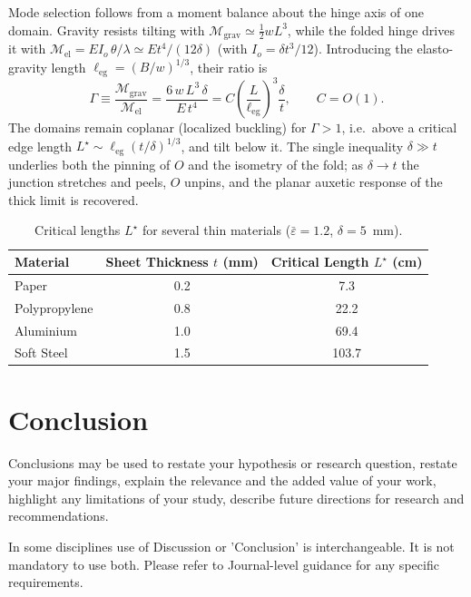\documentclass[pdflatex,sn-mathphys-num]{sn-jnl}%
\theoremstyle{thmstyleone}%
\theoremstyle{thmstyletwo}%
\theoremstyle{thmstylethree}%
\begin{document}
Mode selection follows from a moment balance about the hinge axis of one domain.
Gravity resists tilting with $\mathcal{M}_{\mathrm{grav}}\simeq\tfrac12 wL^3$, while the
folded hinge drives it with $\mathcal{M}_{\mathrm{el}}=E I_o\,\theta/\lambda\simeq
Et^4/(12\delta)$ (with $I_o=\delta t^3/12$). Introducing the elasto-gravity length
$\ell_{\mathrm{eg}}=(B/w)^{1/3}$, their ratio is
\begin{equation}
\Gamma\equiv\frac{\mathcal{M}_{\mathrm{grav}}}{\mathcal{M}_{\mathrm{el}}}
=\frac{6\,w\,L^{3}\,\delta}{E\,t^{4}}
=C\left(\frac{L}{\ell_{\mathrm{eg}}}\right)^{3}\frac{\delta}{t},
\qquad C=O(1).
\end{equation}
The domains remain coplanar (localized buckling) for $\Gamma>1$, i.e.\ above a critical
edge length $L^{\star}\sim\ell_{\mathrm{eg}}(t/\delta)^{1/3}$, and tilt below it. The single
inequality $\delta\gg t$ underlies both the pinning of $O$ and the isometry of the fold;
as $\delta\to t$ the junction stretches and peels, $O$ unpins, and the planar auxetic
response of the thick limit is recovered.



\begin{table}[h!]
\centering
\begin{tabular}{lcc}
\toprule
\textbf{Material} & \textbf{Sheet Thickness $t$ (mm)} & \textbf{Critical Length $L^\star$ (cm)} \\
\midrule
Paper & 0.2 & 7.3 \\
Polypropylene & 0.8 & 22.2 \\
Aluminium & 1.0 & 69.4 \\
Soft Steel & 1.5 & 103.7 \\
\bottomrule
\end{tabular}
\caption{Critical lengths $L^\star$ for several thin materials
($\bar{\varepsilon}=1.2$, $\delta=5$~mm).}
\label{tab:longueur_critique}
\end{table}


\section{Conclusion}\label{sec13}

Conclusions may be used to restate your hypothesis or research question, restate your major findings, explain the relevance and the added value of your work, highlight any limitations of your study, describe future directions for research and recommendations. 

In some disciplines use of Discussion or 'Conclusion' is interchangeable. It is not mandatory to use both. Please refer to Journal-level guidance for any specific requirements. 
\end{document}
